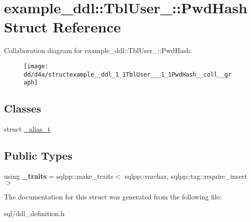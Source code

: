 \hypertarget{structexample__ddl_1_1TblUser___1_1PwdHash}{}\section{example\+\_\+ddl\+:\+:Tbl\+User\+\_\+\+:\+:Pwd\+Hash Struct Reference}
\label{structexample__ddl_1_1TblUser___1_1PwdHash}


Collaboration diagram for example\+\_\+ddl\+:\+:Tbl\+User\+\_\+\+:\+:Pwd\+Hash\+:
\nopagebreak
\begin{figure}[H]
\begin{center}
\leavevmode
\texttt{[image: dd/d4a/structexample\_\_ddl\_1\_1TblUser\_\_\_1\_1PwdHash\_\_coll\_\_graph]}
\end{center}
\end{figure}
\subsection*{Classes}
\begin{DoxyCompactItemize}
\item 
struct \hyperlink{structexample__ddl_1_1TblUser___1_1PwdHash_1_1__alias__t}{\+\_\+alias\+\_\+t}
\end{DoxyCompactItemize}
\subsection*{Public Types}
\begin{DoxyCompactItemize}
\item 
\hypertarget{structexample__ddl_1_1TblUser___1_1PwdHash_a0a89f9aa26096056a16f429ad4aa3e66}{}using {\bfseries \+\_\+traits} = sqlpp\+::make\+\_\+traits$<$ sqlpp\+::varchar, sqlpp\+::tag\+::require\+\_\+insert $>$\label{structexample__ddl_1_1TblUser___1_1PwdHash_a0a89f9aa26096056a16f429ad4aa3e66}

\end{DoxyCompactItemize}


The documentation for this struct was generated from the following file\+:\begin{DoxyCompactItemize}
\item 
sql/ddl\+\_\+definition.\+h\end{DoxyCompactItemize}
